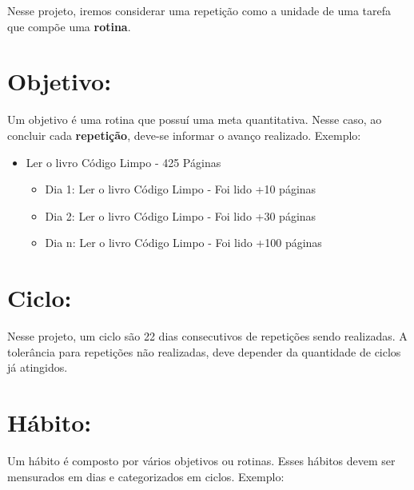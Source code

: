 Nesse projeto, iremos considerar uma repetição como a unidade de uma tarefa que
compõe uma \textbf{rotina}.

\newpage

\section{Objetivo:}

Um objetivo é uma rotina que possuí uma meta quantitativa. Nesse caso, ao concluir
cada \textbf{repetição}, deve-se informar o avanço realizado. Exemplo:

\begin{itemize}
  \item{Ler o livro Código Limpo - 425 Páginas}
  \begin{itemize}
    \item{Dia 1: Ler o livro Código Limpo - Foi lido +10 páginas}
    \item{Dia 2: Ler o livro Código Limpo - Foi lido +30 páginas}
    \item{Dia n: Ler o livro Código Limpo - Foi lido +100 páginas}
  \end{itemize}
\end{itemize}

\section{Ciclo:}

Nesse projeto, um ciclo são 22 dias consecutivos de repetições sendo realizadas.
A tolerância para repetições não realizadas, deve depender da quantidade de ciclos
já atingidos.

\section{Hábito:}

Um hábito é composto por vários objetivos ou rotinas. Esses hábitos devem ser
mensurados em dias e categorizados em ciclos. Exemplo:


